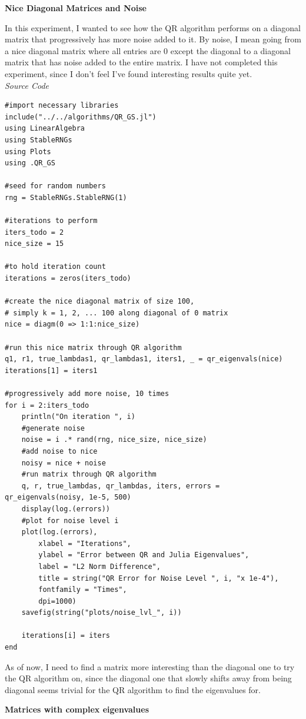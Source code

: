 \documentclass[onecolumn]{webofc}
\begin{document}
\textbf{Nice Diagonal Matrices and Noise}

In this experiment, I wanted to see how the QR algorithm performs on a diagonal matrix that progressively has more noise added to it. By noise, I mean going from a nice diagonal matrix where all entries are 0 except the diagonal to a diagonal matrix that has noise added to the entire matrix. I have not completed this experiment, since I don't feel I've found interesting results quite yet.
\\

\textit{Source Code}
\begin{lstlisting}
#import necessary libraries
include("../../algorithms/QR_GS.jl")
using LinearAlgebra
using StableRNGs
using Plots
using .QR_GS

#seed for random numbers
rng = StableRNGs.StableRNG(1)

#iterations to perform
iters_todo = 2
nice_size = 15

#to hold iteration count
iterations = zeros(iters_todo)

#create the nice diagonal matrix of size 100,
# simply k = 1, 2, ... 100 along diagonal of 0 matrix
nice = diagm(0 => 1:1:nice_size)

#run this nice matrix through QR algorithm
q1, r1, true_lambdas1, qr_lambdas1, iters1, _ = qr_eigenvals(nice)
iterations[1] = iters1

#progressively add more noise, 10 times
for i = 2:iters_todo
    println("On iteration ", i)
    #generate noise
    noise = i .* rand(rng, nice_size, nice_size)
    #add noise to nice
    noisy = nice + noise
    #run matrix through QR algorithm
    q, r, true_lambdas, qr_lambdas, iters, errors = qr_eigenvals(noisy, 1e-5, 500)
    display(log.(errors))
    #plot for noise level i
    plot(log.(errors),
        xlabel = "Iterations",
        ylabel = "Error between QR and Julia Eigenvalues",
        label = "L2 Norm Difference",
        title = string("QR Error for Noise Level ", i, "x 1e-4"),
        fontfamily = "Times",
        dpi=1000)
    savefig(string("plots/noise_lvl_", i))

    iterations[i] = iters
end
\end{lstlisting}

As of now, I need to find a matrix more interesting than the diagonal one to try the QR algorithm on, since the diagonal one that slowly shifts away from being diagonal seems trivial for the QR algorithm to find the eigenvalues for.

\textbf{Matrices with complex eigenvalues}
\end{document}
